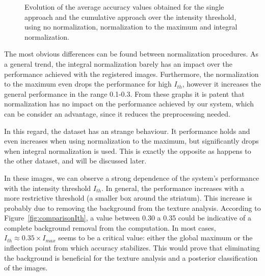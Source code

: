 \begin{figure}
	\caption[Evolution of the average accuracy with the intensity threshold.]{Evolution of the average accuracy values obtained for the single approach and the cumulative approach over the intensity threshold, using no normalization, normalization to the maximum and integral normalization.}
	\label{fig:featuresIth}
\end{figure}

The most obvious differences can be found between normalization procedures. As a general trend, the integral normalization barely has an impact over the performance achieved with the registered images. Furthermore, the normalization to the maximum even drops the performance for high $I_{th}$, however it increases the general performance in the range 0.1-0.3. From these graphs it is patent that normalization has no impact on the performance achieved by our system, which can be consider an advantage, since it reduces the preprocessing needed. 

In this regard, the \vdlvdat{} dataset has an strange behaviour. It performance holds and even increases when using normalization to the maximum, but significantly drops when integral normalization is used. This is exactly the opposite as happens to the other dataset, and will be discussed later.  

In these images, we can observe a strong dependence of the system's performance with the intensity threshold $I_{th}$. In general, the performance increases with a more restrictive threshold (a smaller box around the striatum). This increase is probably due to removing the background from the texture analysis. According to Figure~\ref{fig:comparisonIth}, a value between 0.30 a 0.35 could be indicative of a complete background removal from the computation. In most cases, $I_{th}\approx 0.35\times I_{max}$ seems to be a critical value: either the global maximum or the inflection point from which accuracy stabilizes. This would prove that eliminating the background is beneficial for the texture analysis and a posterior classification of the images. 

